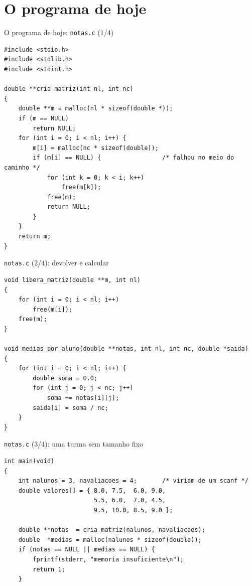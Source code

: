 \documentclass[aspectratio=169]{beamer}
\begin{document}
\section{O programa de hoje}

\begin{frame}[fragile]{O programa de hoje: \texttt{notas.c} (1/4)}
\begin{lstlisting}[basicstyle=\ttfamily\tiny]
#include <stdio.h>
#include <stdlib.h>
#include <stdint.h>

double **cria_matriz(int nl, int nc)
{
    double **m = malloc(nl * sizeof(double *));
    if (m == NULL)
        return NULL;
    for (int i = 0; i < nl; i++) {
        m[i] = malloc(nc * sizeof(double));
        if (m[i] == NULL) {                 /* falhou no meio do caminho */
            for (int k = 0; k < i; k++)
                free(m[k]);
            free(m);
            return NULL;
        }
    }
    return m;
}
\end{lstlisting}
\end{frame}

\begin{frame}[fragile]{\texttt{notas.c} (2/4): devolver e calcular}
\begin{lstlisting}[basicstyle=\ttfamily\scriptsize, firstnumber=23]
void libera_matriz(double **m, int nl)
{
    for (int i = 0; i < nl; i++)
        free(m[i]);
    free(m);
}

void medias_por_aluno(double **notas, int nl, int nc, double *saida)
{
    for (int i = 0; i < nl; i++) {
        double soma = 0.0;
        for (int j = 0; j < nc; j++)
            soma += notas[i][j];
        saida[i] = soma / nc;
    }
}
\end{lstlisting}
\end{frame}

\begin{frame}[fragile]{\texttt{notas.c} (3/4): uma turma sem tamanho fixo}
\begin{lstlisting}[basicstyle=\ttfamily\scriptsize, firstnumber=40]
int main(void)
{
    int nalunos = 3, navaliacoes = 4;       /* viriam de um scanf */
    double valores[] = { 8.0, 7.5,  6.0, 9.0,
                         5.5, 6.0,  7.0, 4.5,
                         9.5, 10.0, 8.5, 9.0 };

    double **notas  = cria_matriz(nalunos, navaliacoes);
    double  *medias = malloc(nalunos * sizeof(double));
    if (notas == NULL || medias == NULL) {
        fprintf(stderr, "memoria insuficiente\n");
        return 1;
    }
\end{lstlisting}
\end{frame}
\end{document}
